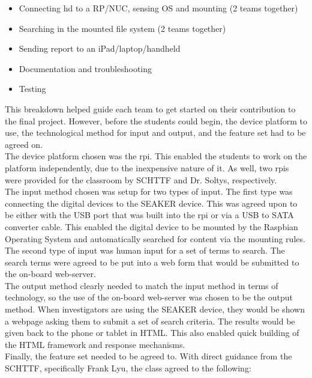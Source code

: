 \documentclass[12pt]{article}
\begin{document}
\begin{itemize}
  \item Connecting hd to a RP/NUC, sensing OS and mounting (2 teams together)
  \item Searching in the mounted file system (2 teams together)
  \item Sending report to an iPad/laptop/handheld
  \item Documentation and troubleshooting
  \item Testing
\end{itemize}

This breakdown helped guide each team to get started on their contribution to the
final project.  However, before the students could begin, the device platform to use,
the technological method for input and output, and the feature set had to be agreed on.\\

The device platform chosen was the \gls{rpi}.  This enabled the students to work on the platform
independently, due to the inexpensive nature of it.  As well, two \glspl{rpi} were provided
for the classroom by SCHTTF and Dr. Soltys, respectively.\\

The input method chosen was setup for two types of input.  The first type was connecting
the digital devices to the SEAKER device.  This was agreed upon to be either with the USB
port that was built into the \gls{rpi} or via a USB to SATA converter cable.  This enabled
the digital device to be mounted by the Raspbian Operating System and automatically 
searched for content via the mounting rules.  The second type of input was human input
for a set of terms to search.  The search terms were agreed to be put into a web form that
would be submitted to the on-board web-server.\\

The output method clearly needed to match the input method in terms of technology, so the
use of the on-board web-server was chosen to be the output method.  When investigators are
using the SEAKER device, they would be shown a webpage asking them to submit a 
set of search criteria.  The results would be given back to the phone or tablet in HTML.
This also enabled quick building of the HTML framework and response mechanisms.\\

Finally, the feature set needed to be agreed to.  With direct guidance from the SCHTTF,
specifically Frank Lyu, the class agreed to the following:
\end{document}
